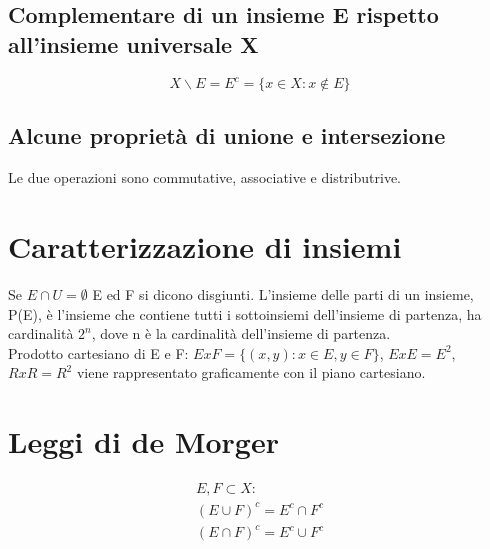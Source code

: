 \subsection{Complementare di un insieme E rispetto all'insieme universale X}
\begin{equation}
X\backslash E=E^{c}=\{x\in X: x\not\in E\}
\end{equation}
\subsection{Alcune propriet\`a di unione e intersezione}
Le due operazioni sono commutative, associative e distributrive.
\section{Caratterizzazione di insiemi}
Se $E \cap U = \emptyset$ E ed F si dicono disgiunti.
L'insieme delle parti di un insieme, P(E), \`e l'insieme che contiene tutti i sottoinsiemi dell'insieme di partenza, ha cardinalit\`a $2^{n}$, dove n \`e la cardinalit\`a
dell'insieme di partenza.\\
Prodotto cartesiano di E e F: $ExF=\{(x,y):x\in E, y\in F\}$, $ExE=E^2$, $RxR=R^2$ viene rappresentato graficamente con il piano cartesiano.
\section{Leggi di de Morger}
\begin{gather*}
E,F \subset X:\\
(E \cup F)^{c}=E^{c}\cap F^{c}\\
(E \cap F)^{c}=E^{c}\cup F^{c}
\end{gather*}